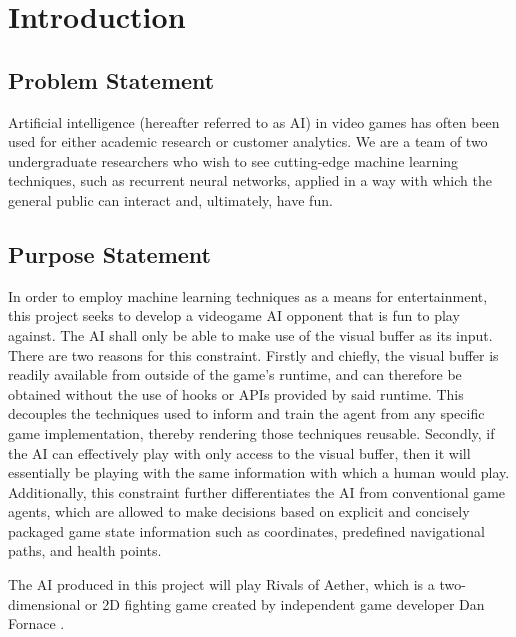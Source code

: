 \chapter{Introduction}


\section{Problem Statement}

Artificial intelligence (hereafter referred to as AI) in video games has often been used for either academic research or customer analytics. We are a team of two undergraduate researchers who wish to see cutting-edge machine learning techniques, such as recurrent neural networks, applied in a way with which the general public can interact and, ultimately, have fun.




\section{Purpose Statement}

 In order to employ machine learning techniques as a means for entertainment, this project seeks to develop a videogame AI opponent that is fun to play against. The AI shall only be able to make use of the visual buffer as its input. There are two reasons for this constraint. Firstly and chiefly, the visual buffer is readily available from outside of the game's runtime, and can therefore be obtained without the use of hooks or APIs provided by said runtime. This decouples the techniques used to inform and train the agent from any specific game implementation, thereby rendering those techniques reusable. Secondly, if the AI can effectively play with only access to the visual buffer, then it will essentially be playing with the same information with which a human would play. Additionally, this constraint further differentiates the AI from conventional game agents, which are allowed to make decisions based on explicit and concisely packaged game state information such as coordinates, predefined navigational paths, and health points.
 
 The AI produced in this project will play Rivals of Aether, which is a two-dimensional or 2D fighting game created by independent game developer Dan Fornace \cite{RivalsofAether}.

